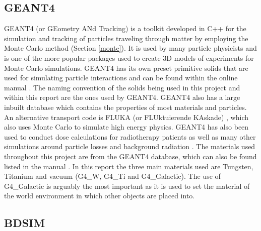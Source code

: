 \documentclass[12pt,a4paper]{article}
\begin{document}

\subsection{GEANT4}\label{GEANT4}
\label{g4}
GEANT4 (or GEometry ANd Tracking) \cite{geant} is a toolkit developed in C++ for the simulation and tracking of particles traveling through matter by employing the Monte Carlo method (Section \ref{monte}). It is used by many particle physicists and is one of the more popular packages used to create 3D models of experiments for Monte Carlo simulations. GEANT4 has its own preset primitive solids that are used for simulating particle interactions and can be found within the online manual \cite{g4man}. The naming convention of the solids being used in this project and within this report are the ones used by GEANT4. GEANT4 also has a large inbuilt database which contains the properties of most materials and particles. An alternative transport code is FLUKA (or FLUktuierende KAskade) \cite{fluka}, which also uses Monte Carlo to simulate high energy physics. GEANT4 has also been used to conduct dose calculations for radiotherapy patients \cite{dose} as well as many other simulations around particle losses and background radiation \cite{will}. The materials used throughout this project are from the GEANT4 database, which can also be found listed in the manual \cite{g4man}. In this report the three main materials used are Tungsten, Titanium and vacuum (G4\_W, G4\_Ti and G4\_Galactic). The use of G4\_Galactic is arguably the most important as it is used to set the material of the world environment in which other objects are placed into.


\subsection{BDSIM}
\label{bdsim}
\end{document}
